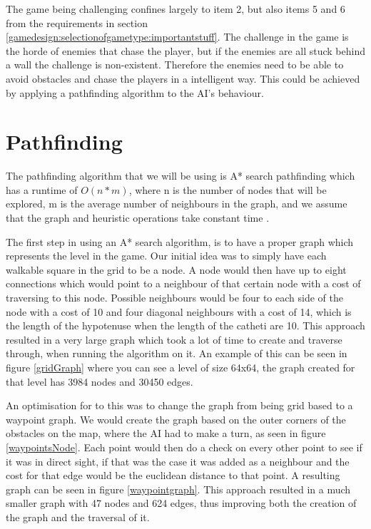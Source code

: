 The game being challenging confines largely to item 2, but also items 5 and 6 from the requirements in section \ref{gamedesign:selectionofgametype:importantstuff}.
The challenge in the game is the horde of enemies that chase the player, but if the enemies are all stuck behind a wall the challenge is non-existent.
Therefore the enemies need to be able to avoid obstacles and chase the players in a intelligent way.
This could be achieved by applying a pathfinding algorithm to the AI's behaviour.

\section{Pathfinding}

The pathfinding algorithm that we will be using is A* search pathfinding which has a runtime of $O(n*m)$, where n is the number of nodes that will be explored, m is the average number of neighbours in the graph, and we assume that the graph and heuristic operations take constant time \cite{AIG:Millington}.

The first step in using an A* search algorithm, is to have a proper graph which represents the level in the game.
Our initial idea was to simply have each walkable square in the grid to be a node.
A node would then have up to eight connections which would point to a neighbour of that certain node with a cost of traversing to this node.
Possible neighbours would be four to each side of the node with a cost of 10 and four diagonal neighbours with a cost of 14, which is the length of the hypotenuse when the length of the catheti are 10.
This approach resulted in a very large graph which took a lot of time to create and traverse through, when running the algorithm on it.
An example of this can be seen in figure \ref{gridGraph} where you can see a level of size 64x64, the graph created for that level has 3984 nodes and 30450 edges.

An optimisation for to this was to change the graph from being grid based to a waypoint graph.
We would create the graph based on the outer corners of the obstacles on the map, where the AI had to make a turn, as seen in figure \ref{waypointsNode}.
Each point would then do a check on every other point to see if it was in direct sight, if that was the case it was added as a neighbour and the cost for that edge would be the euclidean distance to that point.
A resulting graph can be seen in figure \ref{waypointgraph}.
This approach resulted in a much smaller graph with 47 nodes and 624 edges, thus improving both the creation of the graph and the traversal of it.

